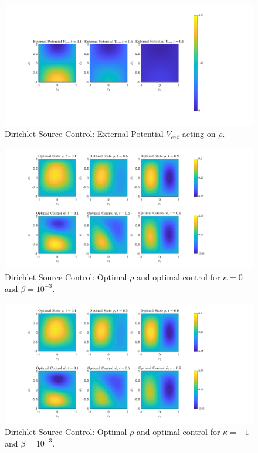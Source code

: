 \documentclass[11pt, a4paper]{article}
\theoremstyle{definition}
\begin{document}
	\begin{figure}[h]
		\centering
		\includegraphics[scale=0.35]{SCEx2Vext.png}
		\caption{Dirichlet Source Control: External Potential $V_{ext}$ acting on $\rho$.} 
		\label{F2V}
	\end{figure}
		\begin{figure}[h]
		\centering
		\includegraphics[scale=0.35]{SCEx2k0.png}
		\caption{Dirichlet Source Control: Optimal $\rho$ and optimal control for $\kappa = 0$ and $\beta = 10^{-3}$.} 
		\label{F2a}
	\end{figure}
	\begin{figure}[h]
		\centering
		\includegraphics[scale=0.35]{SCEx2kn1.png}
		\caption{Dirichlet Source Control: Optimal $\rho$ and optimal control for $\kappa = -1$ and $\beta = 10^{-3}$.} 
		\label{F2b}
	\end{figure}
\end{document}
